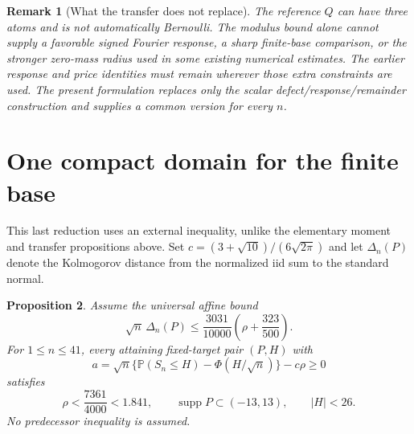 \documentclass[11pt,a4paper]{article}
\newtheorem{theorem}{Proposition}
\newtheorem{remark}[theorem]{Remark}
\newcommand{\Pp}{\mathbb P}
\begin{document}
\begin{remark}[What the transfer does not replace]
The reference $Q$ can have three atoms and is not automatically Bernoulli.
The modulus bound alone cannot supply a favorable signed Fourier response,
a sharp finite-base comparison, or the stronger zero-mass radius used in
some existing numerical estimates. The earlier response and price
identities must remain wherever those extra constraints are used.
The present formulation replaces only the scalar defect/response/remainder
construction and supplies a common version for every $n$.
\end{remark}

\section{One compact domain for the finite base}
This last reduction uses an external inequality, unlike the elementary
moment and transfer propositions above. Set
$c=(3+\sqrt{10})/(6\sqrt{2\pi})$ and let $\Delta_n(P)$ denote the
Kolmogorov distance from the normalized iid sum to the standard normal.
\begin{theorem}\label{v10:primitive:finite}
Assume the universal affine bound
\[
 \sqrt n\,\Delta_n(P)\le\frac{3031}{10000}
                         \left(\rho+\frac{323}{500}\right).
\]
For $1\le n\le41$, every attaining fixed-target pair $(P,H)$ with
\[
 a=\sqrt n\{\Pp(S_n\le H)-\Phi(H/\sqrt n)\}-c\rho\ge0
\]
satisfies
\[
 \rho<\frac{7361}{4000}<1.841,\qquad
 \operatorname{supp}P\subset(-13,13),\qquad |H|<26.
\]
No predecessor inequality is assumed.
\end{theorem}
\end{document}
